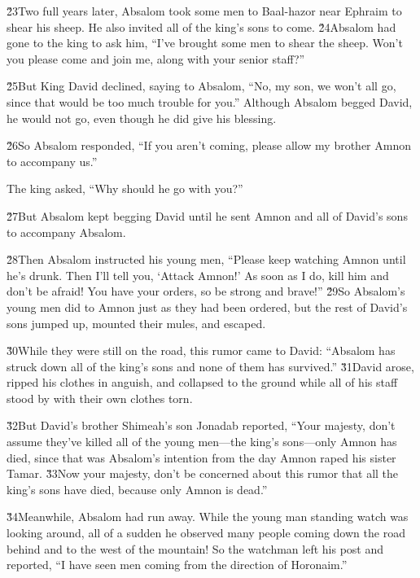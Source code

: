\v{23}Two full years later, Absalom took some men to Baal-hazor near Ephraim to shear his sheep. He also invited all of the king's sons to come. \v{24}Absalom had gone to the king to ask him, ``I've brought some men to shear the sheep. Won't you please come and join me, along with your senior staff?''

\v{25}But King David declined, saying to Absalom, ``No, my son, we won't all go, since that would be too much trouble for you.'' Although Absalom begged David, he would not go, even though he did give his blessing.

\v{26}So Absalom responded, ``If you aren't coming, please allow my brother Amnon to accompany us.''

The king asked, ``Why should he go with you?''

\v{27}But Absalom kept begging David until he sent Amnon and all of David's sons to accompany Absalom.

\v{28}Then Absalom instructed his young men, ``Please keep watching Amnon until he's drunk. Then I'll tell you, `Attack Amnon!' As soon as I do, kill him and don't be afraid! You have your orders, so be strong and brave!'' \v{29}So Absalom's young men did to Amnon just as they had been ordered, but the rest of David's sons jumped up, mounted their mules, and escaped.

\v{30}While they were still on the road, this rumor came to David: ``Absalom has struck down all of the king's sons and none of them has survived.'' \v{31}David arose, ripped his clothes in anguish, and collapsed to the ground while all of his staff stood by with their own clothes torn.

\v{32}But David's brother Shimeah's son Jonadab reported, ``Your majesty, don't assume they've killed all of the young men---the king's sons---only Amnon has died, since that was Absalom's intention from the day Amnon raped his sister Tamar. \v{33}Now your majesty, don't be concerned about this rumor that all the king's sons have died, because only Amnon is dead.''

\v{34}Meanwhile, Absalom had run away. While the young man standing watch was looking around, all of a sudden he observed many people coming down the road behind and to the west of the mountain! So the watchman left his post and reported, ``I have seen men coming from the direction of Horonaim.''

